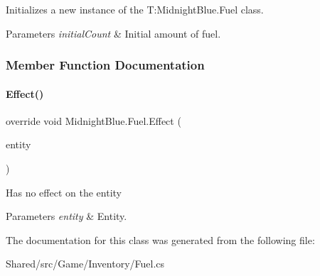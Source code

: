 Initializes a new instance of the T\+:\+Midnight\+Blue.\+Fuel class. 


\begin{DoxyParams}{Parameters}
{\em initial\+Count} & Initial amount of fuel.\\
\hline
\end{DoxyParams}


\subsubsection{Member Function Documentation}
\hypertarget{class_midnight_blue_1_1_fuel_a9ab52c79211ec8cdcc9389f772615ac0}{}\label{class_midnight_blue_1_1_fuel_a9ab52c79211ec8cdcc9389f772615ac0} 
\paragraph{\texorpdfstring{Effect()}{Effect()}}
{\footnotesize\ttfamily override void Midnight\+Blue.\+Fuel.\+Effect (\begin{DoxyParamCaption}\item[{Entity}]{entity }\end{DoxyParamCaption})\hspace{0.3cm}{\ttfamily [inline]}}



Has no effect on the entity 


\begin{DoxyParams}{Parameters}
{\em entity} & Entity.\\
\hline
\end{DoxyParams}


The documentation for this class was generated from the following file\+:\begin{DoxyCompactItemize}
\item 
Shared/src/\+Game/\+Inventory/Fuel.\+cs\end{DoxyCompactItemize}
